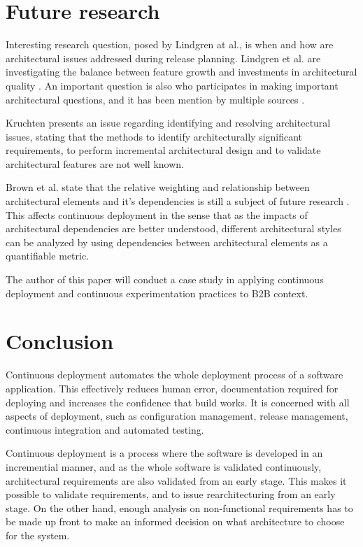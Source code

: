 \documentclass[conference]{IEEEtran}
\begin{document}
\section{Future research}

Interesting research question, posed by Lindgren at al., is when and how are architectural issues addressed during release planning. Lindgren et al. are investigating the balance between feature growth and investments in architectural quality \cite{lindgren2008importance}. An important question is also who participates in making important architectural questions, and it has been mention by multiple sources \cite{lindgren2008importance, kruchten2010software}.

Kruchten presents an issue regarding identifying and resolving architectural issues, stating that the methods to identify architecturally significant requirements, to perform incremental architectural design and to validate architectural features are not well known.

Brown et al. state that the relative weighting and relationship between architectural elements and it's dependencies is still a subject of future research \cite{brown2011analysis}. This affects continuous deployment in the sense that as the impacts of architectural dependencies are better understood, different architectural styles can be analyzed by using dependencies between architectural elements as a quantifiable metric. 

The author of this paper will conduct a case study in applying continuous deployment and continuous experimentation practices to B2B context.

\section{Conclusion} %

Continuous deployment automates the whole deployment process of a software application. This effectively reduces human error, documentation required for deploying and increases the confidence that build works. It is concerned with all aspects of deployment, such as configuration management, release management, continuous integration and automated testing.

Continuous deployment is a process where the software is developed in an incremential manner, and as the whole software is validated continuously, architectural requirements are also validated from an early stage. This makes it possible to validate requirements, and to issue rearchitecturing from an early stage. On the other hand, enough analysis on non-functional requirements has to be made up front to make an informed decision on what architecture to choose for the system.
\end{document}

